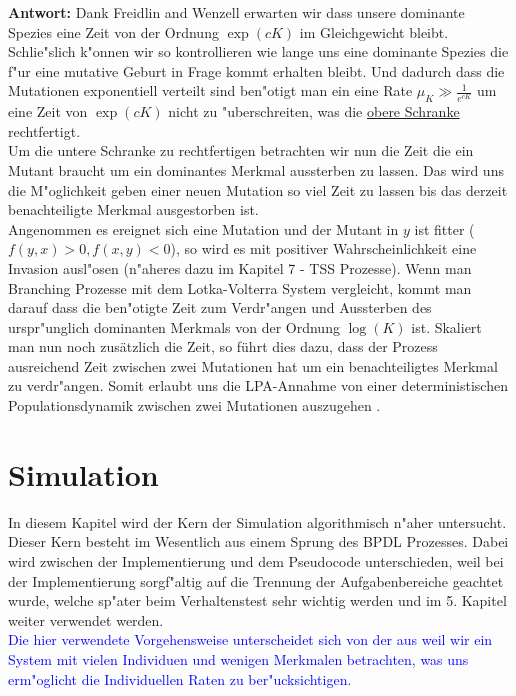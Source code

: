 \documentclass[11pt, a4paper, german]{article}
\theoremstyle{plain}
\begin{document}
	\textbf{Antwort:} Dank Freidlin and Wenzell \cite{freidlin2012random} erwarten wir dass unsere dominante Spezies eine Zeit von der Ordnung $ \exp(cK) $ im Gleichgewicht bleibt. Schlie"slich k"onnen wir so kontrollieren wie lange uns eine dominante Spezies die f"ur eine mutative Geburt in Frage kommt erhalten bleibt. Und dadurch dass die Mutationen exponentiell verteilt sind ben"otigt man ein eine Rate $ \mu_K \gg \frac{1}{e^{cK}} $ um eine Zeit von $ \exp(cK) $ nicht zu "uberschreiten, was die \underline{obere Schranke} rechtfertigt.\\
	Um die untere Schranke zu rechtfertigen betrachten wir nun die Zeit die ein Mutant braucht um ein dominantes Merkmal aussterben zu lassen. Das wird uns die M"oglichkeit geben einer neuen Mutation so viel Zeit zu lassen bis das derzeit benachteiligte Merkmal ausgestorben ist.\\
	Angenommen es ereignet sich eine Mutation und der Mutant in $ y $ ist fitter ($ f(y,x) > 0, f(x,y) < 0 $), so wird es mit positiver Wahrscheinlichkeit eine Invasion ausl"osen (n"aheres dazu im Kapitel 7 - TSS Prozesse). Wenn man Branching Prozesse mit dem Lotka-Volterra System vergleicht, kommt man darauf dass die ben"otigte Zeit zum Verdr"angen und Aussterben des urspr"unglich dominanten Merkmals von der Ordnung $ \log(K) $ ist.
%	
	Skaliert man nun noch zusätzlich die Zeit, so führt dies dazu, dass der Prozess ausreichend Zeit zwischen zwei Mutationen hat um ein benachteiligtes Merkmal zu verdr"angen.
	Somit erlaubt uns die LPA-Annahme von einer deterministischen Populationsdynamik zwischen zwei Mutationen auszugehen \cite{raey}.\\
	

\clearpage
\section{Simulation}
In diesem Kapitel wird der Kern der Simulation algorithmisch n"aher untersucht. Dieser Kern besteht im Wesentlich aus einem Sprung des BPDL Prozesses.
Dabei wird zwischen der Implementierung und dem Pseudocode unterschieden, weil bei der Implementierung sorgf"altig auf die Trennung der Aufgabenbereiche geachtet wurde, welche sp"ater beim Verhaltenstest sehr wichtig werden und im 5. Kapitel weiter verwendet werden.\\
\textcolor{blue}{Die hier verwendete Vorgehensweise unterscheidet sich von der aus \cite{fournier2004microscopic} weil wir ein System mit vielen Individuen und wenigen Merkmalen betrachten, was uns erm"oglicht die Individuellen Raten zu ber"ucksichtigen}.
\end{document}
